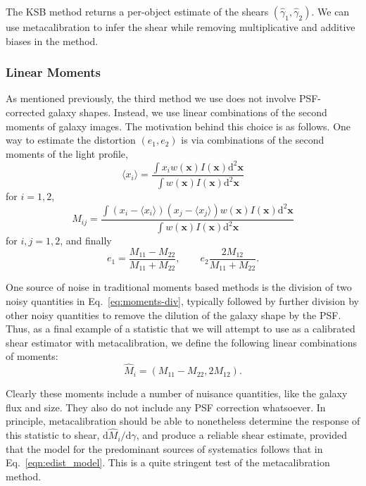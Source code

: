 \documentclass[iop]{emulateapj}
\begin{document}
The KSB method returns a per-object estimate of the shears $(\hat{\gamma}_1, \hat{\gamma}_2)$. We can use
metacalibration to infer the shear while removing multiplicative and additive biases in the method.

\subsubsection{Linear Moments}

As mentioned previously, the third method we use does not involve PSF-corrected galaxy shapes.
Instead, we use linear combinations of the second moments of galaxy images.  The motivation behind
this choice is as follows.  One way to estimate the distortion $(e_1,e_2)$ is via combinations of
the second moments of the light profile,
\begin{equation}
\langle x_i\rangle = \frac{\int x_i w({\mathbf x}) I({\mathbf x}) \mathrm{d}^2{\mathbf x}}{\int w({\mathbf x}) I({\mathbf x}) \mathrm{d}^2{\mathbf x}}
\end{equation}
for $i=1, 2$,
\begin{equation}
M_{ij} = \frac{\int (x_i-\langle x_i\rangle)(x_j-\langle x_j\rangle) w({\mathbf x}) I({\mathbf x}) \mathrm{d}^2{\mathbf x}}{\int w({\mathbf x}) I({\mathbf x}) \mathrm{d}^2{\mathbf x}}
\end{equation}
for $i,j=1,2$, and finally 
\begin{equation}\label{eq:moments-div}
e_1 = \frac{M_{11}-M_{22}}{M_{11}+M_{22}}, \qquad e_2 \frac{2M_{12}}{M_{11}+M_{22}}.
\end{equation}

One source of noise in traditional moments based methods is the division of two noisy quantities in
Eq.~\ref{eq:moments-div}, typically followed by further division by other noisy quantities to remove
the dilution of the galaxy shape by the PSF.  Thus, as a final example of a statistic that we will
attempt to use as a calibrated shear estimator with metacalibration, we define the following linear
combinations of moments:
\begin{equation}
\hat{M}_i = (M_{11}-M_{22}, 2M_{12}).
\end{equation}

Clearly these moments include a number of nuisance quantities, like the galaxy flux and size.  They
also do not include any PSF correction whatsoever.  In principle, metacalibration should be able to
nonetheless determine the response of this statistic to shear,
$\mathrm{d}\hat{M}_i/\mathrm{d}\gamma$, and produce a reliable shear estimate, provided that the
model for the predominant sources of systematics follows that in Eq.~\ref{eqn:edist_model}.  This is
a quite stringent test of the metacalibration method.
\end{document}
